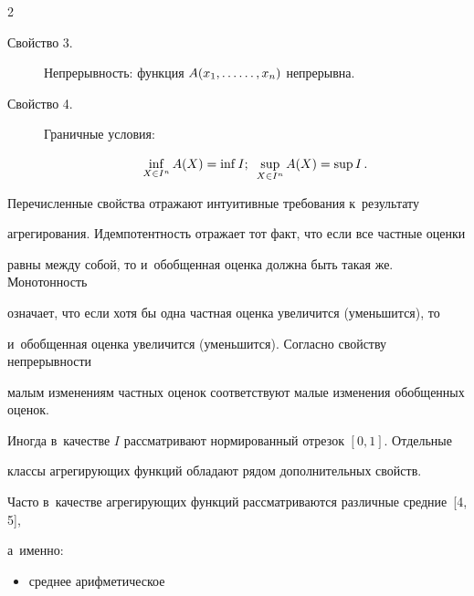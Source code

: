 \begin{multicols}{2}
\begin{description}
\item[Свойство 3.] Непрерывность: функция $A(x_1,\ldots\linebreak \ldots, x_n)$ непрерывна.





\item[Свойство 4.] Граничные условия: 


$$


\inf\limits_{X\in I^n}A(X) = \inf I;\enskip 


\sup\limits_{X\in I^n}A(X)= \sup I\,.


$$


\end{description}








Перечисленные свойства отражают интуитивные требования к~результату 


агрегирования. Идемпотентность  отражает тот факт, что если все частные оценки 


равны между собой, то и~обобщенная оценка должна быть такая же. Монотонность 


означает, что если хотя бы одна частная оценка увеличится (уменьшится), то 


и~обобщенная оценка увеличится (уменьшится). Согласно свойству непрерывности  


малым изменениям частных оценок соответствуют малые изменения обобщенных оценок.





Иногда в~качестве $I$ рассматривают нормированный отрезок $[0, 1]$. Отдельные 


классы агрегирующих функций обладают рядом дополнительных свойств.








Часто в~качестве агрегирующих функций рассматриваются различные средние~[4, 5], 


а~именно: 


\begin{itemize}





\item среднее арифметическое









\end{itemize}
\end{multicols}
